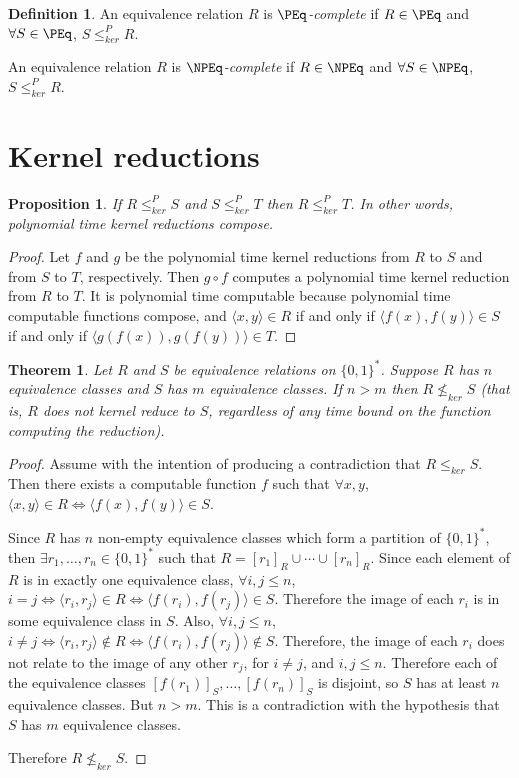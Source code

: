 \documentclass{article}
\newtheorem{theorem}{Theorem}[section]
\newtheorem{proposition}[proposition]{Proposition}
\theoremstyle{definition} \newtheorem{definition}[definition]{Definition}
\newcommand{\sigmastar}{\{0, 1\}^{*}} %
\newcommand{\kr}{\leq^{P}_{ker}} %
\newcommand{\krnt}{\leq_{ker}} %
\newcommand{\nkrnt}{\nleq_{ker}} %
\newcommand{\defn}[1]{\emph{#1}} %
\newcommand{\pair}[2]{\langle#1,#2\rangle} %
\begin{document}
\begin{definition}\label{def:kernel_complete}
  An equivalence relation $R$ is \defn{$\PEq$-complete} if $R\in\PEq$ and
  $\forall S\in\PEq$, $S\kr R$.

  An equivalence relation $R$ is \defn{$\NPEq$-complete} if $R\in\NPEq$ and
  $\forall S\in\NPEq$, $S\kr R$.
\end{definition}

\section{Kernel reductions}

\begin{proposition}\label{prop:compose}
  If $R\kr S$ and $S\kr T$ then $R\kr T$. In other words, polynomial time
  kernel reductions compose.
\end{proposition}
\begin{proof}
  Let $f$ and $g$ be the polynomial time kernel reductions from $R$ to $S$ and
  from $S$ to $T$, respectively. Then $g\circ f$ computes a polynomial time
  kernel reduction from $R$ to $T$. It is polynomial time computable because
  polynomial time computable functions compose, and $\pair{x}{y}\in R$ if and
  only if $\pair{f(x)}{f(y)}\in S$ if and only if $\pair{g(f(x))}{g(f(y))}\in
  T$.
\end{proof}

\begin{theorem}\label{thm:numbers}
  Let $R$ and $S$ be equivalence relations on $\sigmastar$. Suppose $R$ has $n$
  equivalence classes and $S$ has $m$ equivalence classes. If $n>m$ then
  $R\nkrnt S$ (that is, $R$ does not kernel reduce to $S$, regardless of any
  time bound on the function computing the reduction).
\end{theorem}
\begin{proof}
  Assume with the intention of producing a contradiction that $R\krnt S$. Then
  there exists a computable function $f$ such that $\forall x,y$,
  $\pair{x}{y}\in R\iff \pair{f(x)}{f(y)}\in S$.

  Since $R$ has $n$ non-empty equivalence classes which form a partition of
  $\sigmastar$, then $\exists r_1,\ldots,r_n\in\sigmastar$ such that
  $R=[r_1]_R\cup\cdots\cup[r_n]_R$.  Since each element of $R$ is in exactly
  one equivalence class, $\forall i,j\leq n$, $i=j\iff\pair{r_i}{r_j}\in
  R\iff\pair{f(r_i)}{f(r_j)}\in S$. Therefore the image of each $r_i$ is in
  some equivalence class in $S$.  Also, $\forall i,j\leq n$, $i\neq j\iff
  \pair{r_i}{r_j}\notin R\iff \pair{f(r_i)}{f(r_j)}\notin S$. Therefore, the
  image of each $r_i$ does not relate to the image of any other $r_j$, for
  $i\neq j$, and $i,j\leq n$. Therefore each of the equivalence classes
  $[f(r_1)]_S,\ldots,[f(r_n)]_S$ is disjoint, so $S$ has at least $n$
  equivalence classes. But $n>m$. This is a contradiction with the hypothesis
  that $S$ has $m$ equivalence classes.

  Therefore $R\nkrnt S$.
\end{proof}
\end{document}
